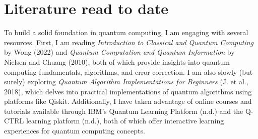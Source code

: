 \vspace{0.3cm}

\section{Literature read to date}

To build a solid foundation in quantum computing, I am engaging with several resources. First, I am reading \textit{Introduction to Classical and Quantum Computing} by Wong (2022) and \textit{Quantum Computation and Quantum Information} by Nielsen and Chuang (2010), both of which provide insights into quantum computing fundamentals, algorithms, and error correction.  I am also slowly (but surely) exploring  \textit{Quantum Algorithm Implementations for Beginners} (J. et al., 2018), which delves into practical implementations of quantum algorithms using platforms like Qiskit. Additionally, I have taken advantage of online courses and tutorials available through IBM's Quantum Learning Platform (n.d.) and the Q-CTRL learning platform (n.d.), both of which offer interactive learning experiences for quantum computing concepts.